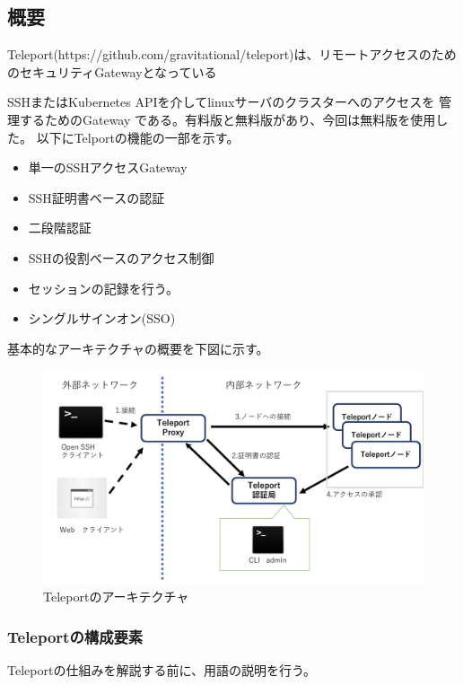 \documentclass[11pt,a4j,titlepage]{jreport}
\begin{document}
\subsection*{概要}
Teleport(https://github.com/gravitational/teleport)は、リモートアクセスのためのセキュリティGatewayとなっている


SSHまたはKubernetes APIを介してlinuxサーバのクラスターへのアクセスを
管理するためのGateway である。有料版と無料版があり、今回は無料版を使用した。
以下にTelportの機能の一部を示す。

\begin{itemize}
    \setlength{\parskip}{0.1cm} %
    \setlength{\itemsep}{0.1cm}
    \item 単一のSSHアクセスGateway
    \item SSH証明書ベースの認証
    \item 二段階認証
    \item SSHの役割ベースのアクセス制御
    \item セッションの記録を行う。
    \item シングルサインオン(SSO)
\end{itemize}

基本的なアーキテクチャの概要を下図に示す。
\begin{figure}[H]
    \centering
    \includegraphics*[width=1.0\textwidth,page=1]{graphs/teleport_archtecture.pdf}
    \caption{Teleportのアーキテクチャ}
    \label{teleport_archtecture}
\end{figure}


\subsubsection*{Teleportの構成要素}
Teleportの仕組みを解説する前に、用語の説明を行う。
\end{document}
